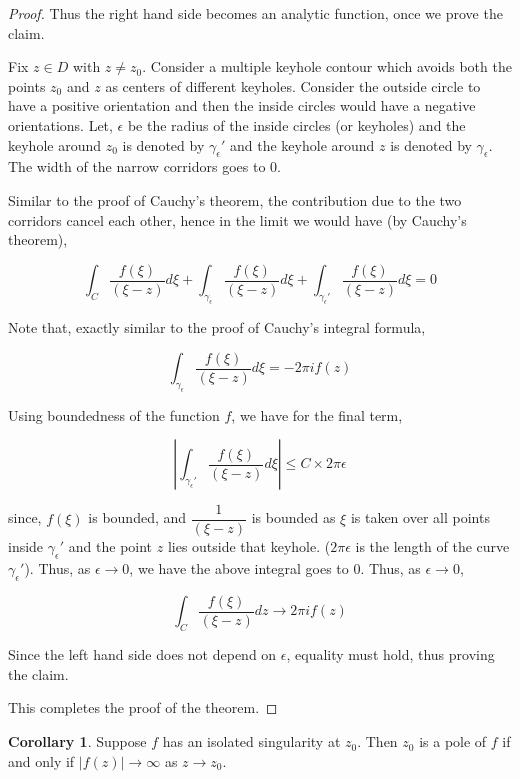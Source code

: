 \documentclass[12pt]{article}
\theoremstyle{definition}
\newtheorem{cor}{Corollary}
\newenvironment{corollary}{
\begin{tcolorbox}[colback=blue!5!white,colframe=blue!75!black, parbox = false]\begin{cor} }{\end{cor}\end{tcolorbox} }
\begin{document}
\begin{proof}
    Thus the right hand side becomes an analytic function, once we prove the claim.

    Fix $z \in D$ with $z \neq z_0$. Consider a multiple keyhole contour which avoids both the points $z_0$ and $z$ as centers of different keyholes. Consider the outside circle to have a positive orientation and then the inside circles would have a negative orientations. Let, $\epsilon$ be the radius of the inside circles (or keyholes) and the keyhole around $z_0$ is denoted by $\gamma_\epsilon'$ and the keyhole around $z$ is denoted by $\gamma_\epsilon$. The width of the narrow corridors goes to $0$.

    Similar to the proof of Cauchy's theorem, the contribution due to the two corridors cancel each other, hence in the limit we would have (by Cauchy's theorem),

    $$
    \int_C \dfrac{f(\xi)}{(\xi - z)} d\xi + \int_{\gamma_\epsilon}\dfrac{f(\xi)}{(\xi - z)} d\xi + \int_{\gamma_\epsilon'} \dfrac{f(\xi)}{(\xi - z)} d\xi = 0 
    $$

    Note that, exactly similar to the proof of Cauchy's integral formula,

    $$
    \int_{\gamma_\epsilon}\dfrac{f(\xi)}{(\xi - z)} d\xi = -2\pi i f(z)
    $$

    Using boundedness of the function $f$, we have for the final term,

    $$
    \left\vert \int_{\gamma_\epsilon'}\dfrac{f(\xi)}{(\xi - z)} d\xi \right\vert \leq C \times 2\pi \epsilon
    $$

    since, $f(\xi)$ is bounded, and $\dfrac{1}{(\xi - z)}$ is bounded as $\xi$ is taken over all points inside $\gamma_\epsilon'$ and the point $z$ lies outside that keyhole. ($2\pi \epsilon$ is the length of the curve $\gamma_\epsilon'$). Thus, as $\epsilon \rightarrow 0$, we have the above integral goes to 0. Thus, as $\epsilon \rightarrow 0$,

    $$
    \int_{C} \dfrac{f(\xi)}{(\xi - z)}dz \rightarrow 2\pi i f(z)
    $$

    Since the left hand side does not depend on $\epsilon$, equality must hold, thus proving the claim.

    This completes the proof of the theorem.
\end{proof}


\begin{corollary}
    Suppose $f$ has an isolated singularity at $z_0$. Then $z_0$ is a pole of $f$ if and only if $\vert f(z) \vert \rightarrow \infty$ as $z \rightarrow z_0$. 
\end{corollary}
\end{document}
